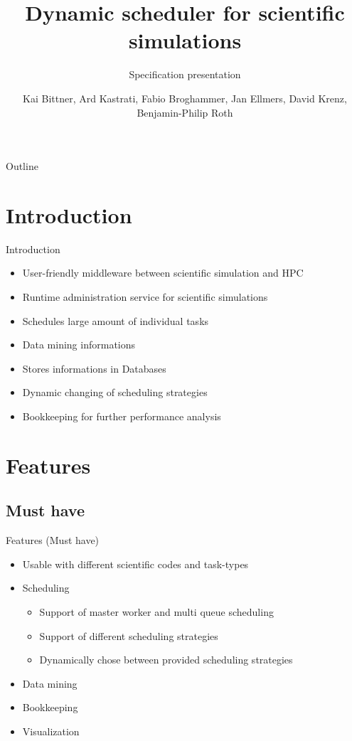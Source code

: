 \documentclass[18pt]{beamer}
\title[Specification presentation]{Dynamic scheduler for scientific simulations}
\subtitle{Specification presentation}
\author{Kai Bittner, Ard Kastrati, Fabio Broghammer, Jan Ellmers, David Krenz, Benjamin-Philip Roth}
\institute{Steinbuch Centre for Computing (SCC)}
\begin{document}

\begin{frame}
\titlepage
\end{frame}

\begin{frame}{Outline}
\tableofcontents
\end{frame}

\section{Introduction}
	\begin{frame}{Introduction}
		\begin{itemize}
			\pause
			\item User-friendly middleware between scientific simulation and HPC
			\pause
			\item Runtime administration service for scientific simulations
			\pause
			\item Schedules large amount of individual tasks
			\pause
			\item Data mining informations
			\pause
			\item Stores informations in Databases
			\pause
			\item Dynamic changing of scheduling strategies
			\pause
			\item Bookkeeping for further performance analysis
		\end{itemize}
	\end{frame}
	
\section{Features}
	\subsection{Must have}
	\begin{frame}{Features (Must have)}
		\begin{itemize}
			\pause
			\item Usable with different scientific codes and task-types
			\pause
			\item Scheduling	
				\begin{itemize}
					\item Support of master worker and multi queue scheduling
					\item Support of different scheduling strategies
					\item Dynamically chose between provided scheduling strategies
				\end{itemize}
				
			\pause
			\item Data mining
			\pause
			\item Bookkeeping
			\pause
			\item Visualization
		\end{itemize}
	\end{frame}
	
\end{document}
